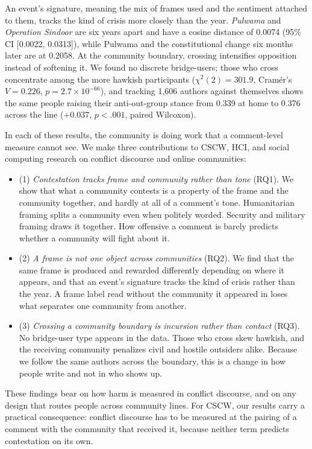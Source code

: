 An event's signature, meaning the mix of frames used and the sentiment attached to them, tracks the kind of crisis more closely than the year. \textit{Pulwama} and \textit{Operation Sindoor} are six years apart and have a cosine distance of 0.0074 (95\% CI [0.0022, 0.0313]), while Pulwama and the constitutional change six months later are at 0.2058. At the community boundary, crossing intensifies opposition instead of softening it. We found no discrete bridge-users; those who cross concentrate among the more hawkish participants ($\chi^2(2) = 301.9$, Cram\'er's $V = 0.226$, $p = 2.7\times10^{-66}$), and tracking 1,606 authors against themselves shows the same people raising their anti-out-group stance from 0.339 at home to 0.376 across the line
($+0.037$, $p < .001$, paired Wilcoxon).

In each of these results, the community is doing work that a comment-level measure cannot see. We make three contributions to CSCW, HCI, and social computing research on conflict discourse and online communities: 
\begin{itemize}
\item (1) \textit{Contestation tracks frame and community rather than tone} (RQ1). We show that what a community contests is a property of the frame and the community together, and hardly at all of a comment's tone. Humanitarian framing splits a community even when politely worded. Security and military framing draws it together. How offensive a comment is barely predicts whether a community will fight about it.
\item (2) \textit{A frame is not one object across communities} (RQ2). We find that the same frame is produced and rewarded differently depending on where it appears, and that an event's signature tracks the kind of crisis rather than the year. A frame label read without the community it appeared in loses what separates one community from another. 
\item (3) \textit{Crossing a community boundary is incursion rather than contact} (RQ3). No bridge-user type appears in the data. Those who cross skew hawkish, and the receiving community penalizes civil and hostile outsiders alike. Because we follow the same authors across the boundary, this is a change in how people write and not in who shows up. 
\end{itemize}
These findings bear on how harm is measured in conflict discourse, and on any design that routes people across community lines. For CSCW, our results carry a practical consequence: conflict discourse has to be measured at the pairing of a comment with the community that received it, because neither term predicts contestation on its own.
